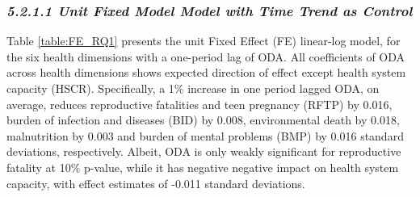 \subsubsection*{\quad \quad \textit{5.2.1.1 Unit Fixed Model Model with Time Trend as Control}}
Table \ref{table:FE_RQ1} presents the unit Fixed Effect (FE) linear-log model, for the six health dimensions with a one-period lag of ODA. All coefficients of ODA across health dimensions shows expected direction of effect except health system capacity (HSCR). Specifically, a 1\% increase in one period lagged ODA, on average, reduces reproductive fatalities and teen pregnancy (RFTP) by 0.016, burden of infection and diseases (BID) by 0.008, environmental death by 0.018, malnutrition by 0.003 and burden of mental problems (BMP) by 0.016 standard deviations, respectively. Albeit, ODA is only weakly significant for reproductive fatality at 10\% p-value, while it has negative negative impact on health system capacity, with effect estimates of -0.011 standard deviations. 


